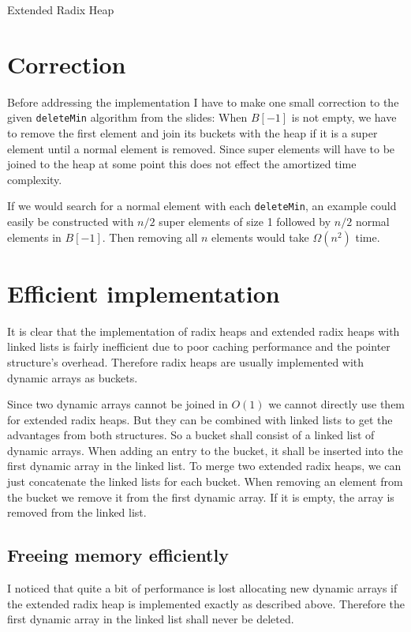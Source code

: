 \documentclass[10pt, a4paper]{article}
\begin{document}
\begin{center}
\LARGE Extended Radix Heap
\end{center}

\section{Correction}

Before addressing the implementation I have to make one small correction to the given \texttt{deleteMin} algorithm from the slides:
When $B[-1]$ is not empty, we have to remove the first element and join its buckets with the heap if it is a super element until a normal element is removed.
Since super elements will have to be joined to the heap at some point this does not effect the amortized time complexity.

If we would search for a normal element with each \texttt{deleteMin}, an example could easily be constructed with $n/2$ super elements of size 1 followed by $n/2$ normal elements in $B[-1]$.
Then removing all $n$ elements would take $\Omega(n^2)$ time. 

\section{Efficient implementation}

It is clear that the implementation of radix heaps and extended radix heaps with linked lists is fairly inefficient due to poor caching performance and the pointer structure's overhead.
Therefore radix heaps are usually implemented with dynamic arrays as buckets.

Since two dynamic arrays cannot be joined in $O(1)$ we cannot directly use them for extended radix heaps.
But they can be combined with linked lists to get the advantages from both structures.
So a bucket shall consist of a linked list of dynamic arrays.
When adding an entry to the bucket, it shall be inserted into the first dynamic array in the linked list.
To merge two extended radix heaps, we can just concatenate the linked lists for each bucket.
When removing an element from the bucket we remove it from the first dynamic array. If it is empty, the array is removed from the linked list.

\subsection{Freeing memory efficiently}

I noticed that quite a bit of performance is lost allocating new dynamic arrays if the extended radix heap is implemented exactly as described above. Therefore the first dynamic array in the linked list shall never be deleted.
\end{document}
